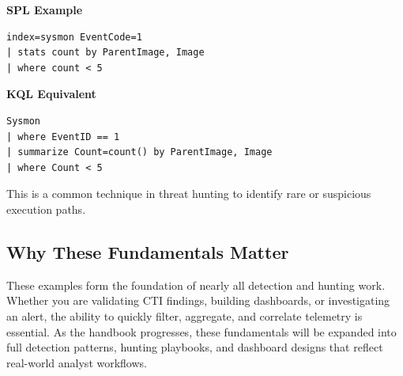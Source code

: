 \textbf{SPL Example}
\begin{lstlisting}
index=sysmon EventCode=1
| stats count by ParentImage, Image
| where count < 5
\end{lstlisting}

\textbf{KQL Equivalent}
\begin{lstlisting}
Sysmon
| where EventID == 1
| summarize Count=count() by ParentImage, Image
| where Count < 5
\end{lstlisting}

This is a common technique in threat hunting to identify rare or suspicious execution paths.

\subsection*{Why These Fundamentals Matter}

These examples form the foundation of nearly all detection and hunting work. Whether you are validating CTI findings, building dashboards, or investigating an alert, the ability to quickly filter, aggregate, and correlate telemetry is essential. As the handbook progresses, these fundamentals will be expanded into full detection patterns, hunting playbooks, and dashboard designs that reflect real-world analyst workflows.
